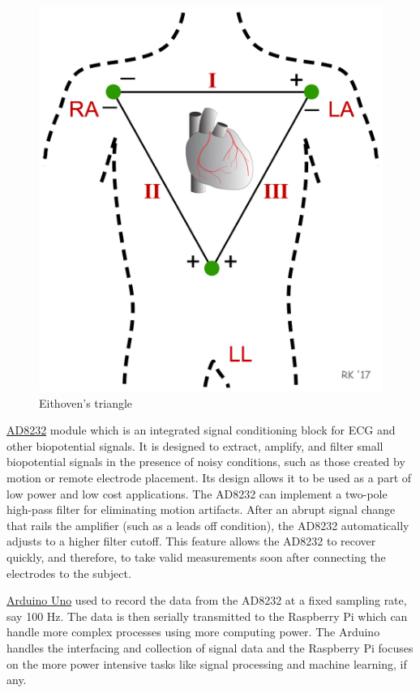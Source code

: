 \documentclass[11pt]{article}
\theoremstyle{definition}
\begin{document}
  \begin{figure}[h]
    \centering
    \includegraphics[scale=0.1]{images/eithoven_triangle.png}
    \caption{Eithoven's triangle\cite{cvp:ECG_eithoven}}
    \label{fig:eithoven_triangle}
  \end{figure}

  \underline{AD8232}\cite{ae:ad8232} module which is an integrated signal conditioning block for ECG and other biopotential signals.
  It is designed to extract, amplify, and filter small biopotential signals in the presence of noisy conditions, such as those created by motion or remote electrode placement.
  Its design allows it to be used as a part of low power and low cost applications.
  The AD8232 can implement a two-pole high-pass filter for eliminating motion artifacts.
  After an abrupt signal change that rails the amplifier (such as a leads off condition), the AD8232 automatically adjusts to a higher filter cutoff.
  This feature allows the AD8232 to recover quickly, and therefore, to take valid measurements soon after connecting the electrodes to the subject.

  \underline{Arduino Uno} used to record the data from the AD8232 at a fixed sampling rate, say 100 Hz.
 The data is then serially transmitted to the Raspberry Pi which can handle more complex processes using more computing power.   The Arduino handles the interfacing and collection of signal data and the Raspberry Pi focuses on the more power intensive tasks like signal processing and machine learning, if any.
\end{document}
